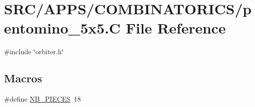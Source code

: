 \hypertarget{pentomino__5x5_8_c}{}\section{S\+R\+C/\+A\+P\+P\+S/\+C\+O\+M\+B\+I\+N\+A\+T\+O\+R\+I\+C\+S/pentomino\+\_\+5x5.C File Reference}
\label{pentomino__5x5_8_c}
{\ttfamily \#include \char`\"{}orbiter.\+h\char`\"{}}\newline
\subsection*{Macros}
\begin{DoxyCompactItemize}
\item 
\#define \mbox{\hyperlink{pentomino__5x5_8_c_a6af429f2b2d334f82c91c852413498f2}{N\+B\+\_\+\+P\+I\+E\+C\+ES}}~18
\end{DoxyCompactItemize}
